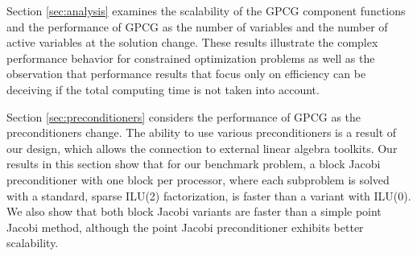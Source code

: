 Section \ref{sec:analysis} examines the scalability of the
GPCG component functions and the performance of GPCG
as the number of variables and the number of active
variables at the solution change. These results illustrate the
complex performance behavior for constrained optimization
problems as well as the observation that
performance results that focus only on efficiency can be
deceiving if the total computing time is not taken into account.

Section \ref{sec:preconditioners} considers the performance
of GPCG as the preconditioners change. The
ability to use various preconditioners is
a result of our design, which allows the
connection to external linear algebra toolkits.
Our results in this section show that for our benchmark
problem, a block Jacobi preconditioner with
one block per processor, where each subproblem is solved
with a standard, sparse ILU(2) factorization, is faster than
a variant with ILU(0). We also show that both block Jacobi variants are faster
than a simple point Jacobi method,
although the point Jacobi preconditioner exhibits
better scalability.


